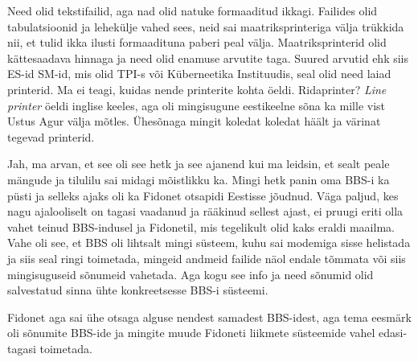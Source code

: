 
Need olid tekstifailid, aga nad olid natuke formaaditud ikkagi. Failides olid tabulatsioonid ja lehekülje vahed  sees, neid sai maatriksprinteriga välja trükkida nii, et tulid ikka ilusti formaadituna paberi peal välja. Maatriksprinterid olid kättesaadava hinnaga ja need olid enamuse arvutite taga.  Suured arvutid ehk siis ES-id SM-id, mis olid TPI-s või Küberneetika Instituudis, seal olid need laiad printerid. Ma ei teagi, kuidas nende printerite kohta öeldi. Ridaprinter? \emph{Line printer} öeldi inglise keeles, aga  oli mingisugune eestikeelne sõna ka mille vist Ustus Agur välja mõtles. Ühesõnaga mingit koledat koledat häält ja värinat tegevad printerid.


Jah, ma arvan, et see oli see hetk ja see ajanend kui ma leidsin, et sealt  peale mängude ja  tilulilu sai midagi mõistlikku ka. Mingi hetk panin oma BBS-i ka püsti ja selleks ajaks oli ka Fidonet otsapidi Eestisse jõudnud. Väga paljud, kes nagu ajalooliselt on tagasi vaadanud ja rääkinud sellest ajast, ei pruugi eriti olla vahet teinud BBS-indusel ja Fidonetil,  mis tegelikult  olid kaks eraldi maailma. Vahe oli see, et BBS oli lihtsalt mingi süsteem, kuhu sai modemiga sisse helistada ja siis seal ringi toimetada,  mingeid andmeid failide näol endale tõmmata või siis mingisuguseid sõnumeid vahetada. Aga kogu see info ja need sõnumid olid salvestatud sinna ühte konkreetsesse BBS-i süsteemi.

Fidonet aga sai ühe otsaga  alguse nendest samadest BBS-idest, aga tema eesmärk oli sõnumite BBS-ide ja mingite muude Fidoneti liikmete süsteemide vahel edasi-tagasi toimetada. 


